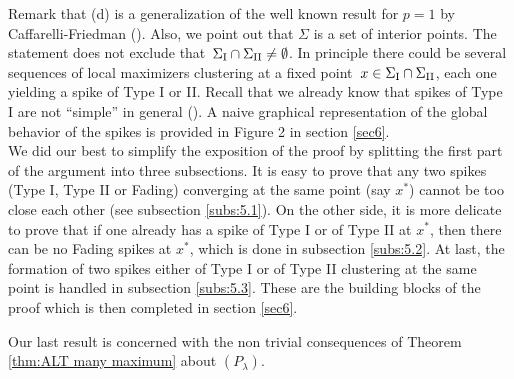 \documentclass[10pt]{amsart}
\newcommand{\lm}{\lambda}
\newcommand{\prl}{{$(P_{\lm})$}}
\begin{document}
Remark that (d) is a generalization of the well known result for $p=1$ by Caffarelli-Friedman (\cite{CF}).   
Also, we point out that $\Sigma$ is a set of interior points. The statement does not exclude that~$\Sigma_{\rm I}\cap \Sigma_{\rm II}\neq\emptyset$.
In principle there could be several sequences of local maximizers clustering
at a fixed
point~$x\in \Sigma_{\rm I}\cap \Sigma_{\rm II}$, each one yielding a spike of Type I or II. Recall that we already know that
spikes of Type I are not ``simple'' in general (\cite{DY}). A naive graphical representation of the global behavior of the
spikes is provided in Figure 2 in section \ref{sec6}.\\
We did our best to simplify the exposition of the proof by splitting the first part of the argument into
three subsections. It is easy to prove that any two spikes (Type I, Type II or Fading) converging at the same point (say $x^*$)
cannot be too close each other (see subsection \ref{subs:5.1}).
On the other side, it is more delicate to prove that if one already has a spike of Type I or of Type II at $x^*$,
then there can be no Fading spikes at $x^*$, which is done
in subsection \ref{subs:5.2}. At last, the formation of two spikes either of Type I or of Type II clustering at the same point
is handled in subsection \ref{subs:5.3}.
These are the building blocks of the proof which is then completed in section \ref{sec6}.

\bigskip

Our last result is concerned with the non trivial consequences of Theorem \ref{thm:ALT many maximum} about \prl.
\end{document}
